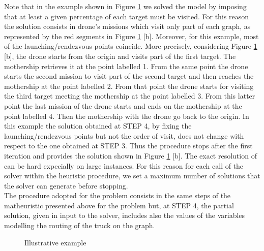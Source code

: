 \noindent
Note that in the example shown in Figure \ref{fig:example} we solved the \AMD\xspace model by imposing that at least a given percentage of each target must be visited. For this reason the solution consists in drone's missions which visit only part of each graph, as represented by the red segments in Figure \ref{fig:example} [b]. Moreover, for this example, most of the launching/rendezvous points coincide. More precisely, considering Figure \ref{fig:example} [b], the drone starts from the origin and visits part of the first target. The mothership retrieves it at the point labelled 1. From the same point the drone starts the second mission to visit part of the second target and then reaches the mothership at the point labelled 2. From that point the drone starts for visiting the third target meeting the mothership at the point labelled 3. From this latter point the last mission of the drone starts and ends on the mothership at the point labelled 4. Then the mothership with the drone go back to the origin. In this example the solution obtained at STEP 4, by fixing the launching/rendezvous points but not the order of visit, does not change with respect to the one obtained at STEP 3. Thus the procedure stops after the first iteration and provides the solution shown in Figure \ref{fig:example} [b].
The exact resolution of \AMD\xspace can be hard expecially on large instances. For this reason for each call of the solver within the heuristic procedure, we set a maximum number of solutions that the solver can generate before stopping.\\
The procedure adopted for the  \NMD \xspace problem consists in the same steps of the matheuristic presented above for the \AMD \xspace problem but, at STEP 4, the partial solution, given in input to the solver, includes also the values of the variables modelling the routing of the truck on the graph.


\begin{figure}%
    \centering
    \qquad
    \caption{Illustrative example}%
    \label{fig:example}%
\end{figure}






